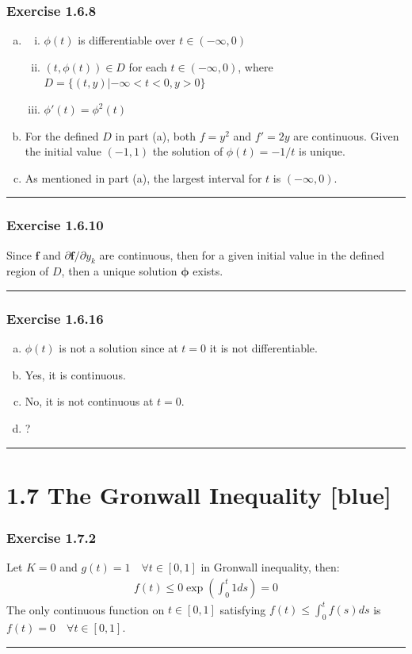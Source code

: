 \documentclass[12pt, letterpaper]{scrartcl}
\begin{document}
\subsubsection*{Exercise 1.6.8}
\begin{enumerate}[(a)]
    \item 
    \begin{enumerate}[(i)]
        \item $\phi(t)$ is differentiable over $t\in(-\infty, 0)$
        \item $(t,\phi(t))\in D$ for each $t\in(-\infty,0)$, where $D=\{(t,y)| -\infty<t<0, y>0\}$
        \item $\phi'(t)=\phi^2(t)$
    \end{enumerate}
    \item For the defined $D$ in part (a), both $f=y^2$ and $f'=2y$ are continuous. Given the initial value $(-1, 1)$ the solution of $\phi(t)=-1/t$ is unique.
    \item As mentioned in part (a), the largest interval for $t$ is $(-\infty, 0)$.
\end{enumerate}
\vskip1mm\hrule

\subsubsection*{Exercise 1.6.10}
Since $\bm{f}$ and $\partial\bm{f}/\partial y_k$ are continuous, then for a given initial value in the defined region of $D$, then a unique solution $\bm\phi$ exists.
\vskip1mm\hrule

\subsubsection*{Exercise 1.6.16}
\begin{enumerate}[(a)]
    \item 
    $\phi(t)$ is not a solution since at $t=0$ it is not differentiable.
    \item Yes, it is continuous.
    \item No, it is not continuous at $t=0$.
    \item ?
\end{enumerate}
\vskip1mm\hrule
\clearpage

\section*{1.7 The Gronwall Inequality \xrfill[2pt]{3pt}[blue]}

\subsubsection*{Exercise 1.7.2}
Let $K=0$ and $g(t)=1 \quad\forall t\in[0,1]$ in Gronwall inequality, then:
\begin{align*}
    f(t)\leq0\exp(\int_0^t1ds)=0
\end{align*}
The only continuous function on $t\in[0,1]$ satisfying $f(t)\leq\int_0^tf(s)ds$ is $f(t)=0\quad\forall t\in[0,1]$.
\vskip1mm\hrule
\end{document}
